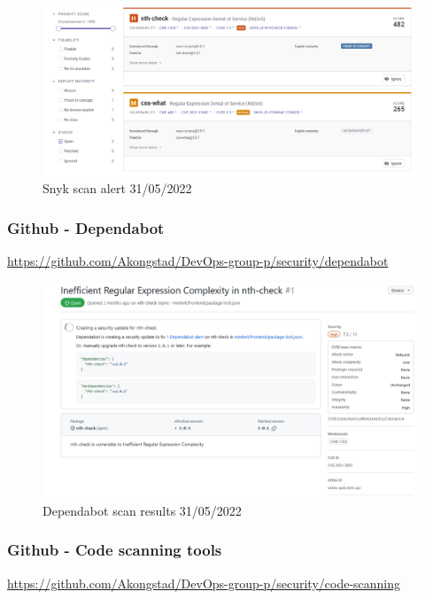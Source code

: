 \begin {figure}[H]
    \centering
    \includegraphics[scale=0.40]{images/analysis_tools/alertSnyk.PNG}
    \caption{Snyk scan alert 31/05/2022}
    \label{fig:snykAlert}
\end{figure}

\subsubsection{Github - Dependabot}
\label{app:codeAnalDependabot}
\href{https://github.com/Akongstad/DevOps-group-p/security/dependabot}{https://github.com/Akongstad/DevOps-group-p/security/dependabot}
\begin {figure}[H]
    \centering
    \includegraphics[scale=0.50]{images/analysis_tools/alertDependabot.PNG}
    \caption{Dependabot scan results 31/05/2022}
    \label{fig:dependabot}
\end{figure}

\subsubsection{Github - Code scanning tools}
\label{app:codeAnalQl}
\href{https://github.com/Akongstad/DevOps-group-p/security/code-scanning}{https://github.com/Akongstad/DevOps-group-p/security/code-scanning}

